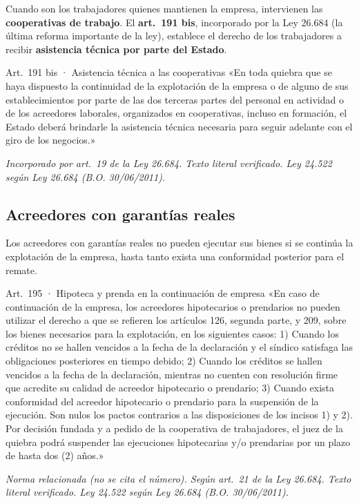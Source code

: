 \documentclass[12pt,oneside]{book}
\begin{document}
Cuando son los trabajadores quienes mantienen la empresa, intervienen las \textbf{cooperativas de trabajo}. El \textbf{art.~191 bis}, incorporado por la Ley 26.684 (la última reforma importante de la ley), establece el derecho de los trabajadores a recibir \textbf{asistencia técnica por parte del Estado}.

\begin{norma}{Art.~191 bis · Asistencia técnica a las cooperativas}
«En toda quiebra que se haya dispuesto la continuidad de la explotación de la empresa o de alguno de sus establecimientos por parte de las dos terceras partes del personal en actividad o de los acreedores laborales, organizados en cooperativas, incluso en formación, el Estado deberá brindarle la asistencia técnica necesaria para seguir adelante con el giro de los negocios.»

\par\smallskip\textit{Incorporado por art.~19 de la Ley 26.684. Texto literal verificado. Ley 24.522 según Ley 26.684 (B.O. 30/06/2011).}
\end{norma}

\subsection{Acreedores con garantías reales}

Los acreedores con garantías reales no pueden ejecutar sus bienes si se continúa la explotación de la empresa, hasta tanto exista una conformidad posterior para el remate.

\begin{norma}{Art.~195 · Hipoteca y prenda en la continuación de empresa}
«En caso de continuación de la empresa, los acreedores hipotecarios o prendarios no pueden utilizar el derecho a que se refieren los artículos 126, segunda parte, y 209, sobre los bienes necesarios para la explotación, en los siguientes casos: 1) Cuando los créditos no se hallen vencidos a la fecha de la declaración y el síndico satisfaga las obligaciones posteriores en tiempo debido; 2) Cuando los créditos se hallen vencidos a la fecha de la declaración, mientras no cuenten con resolución firme que acredite su calidad de acreedor hipotecario o prendario; 3) Cuando exista conformidad del acreedor hipotecario o prendario para la suspensión de la ejecución. Son nulos los pactos contrarios a las disposiciones de los incisos 1) y 2). Por decisión fundada y a pedido de la cooperativa de trabajadores, el juez de la quiebra podrá suspender las ejecuciones hipotecarias y/o prendarias por un plazo de hasta dos (2) años.»

\par\smallskip\textit{Norma relacionada (no se cita el número). Según art.~21 de la Ley 26.684. Texto literal verificado. Ley 24.522 según Ley 26.684 (B.O. 30/06/2011).}
\end{norma}
\end{document}
